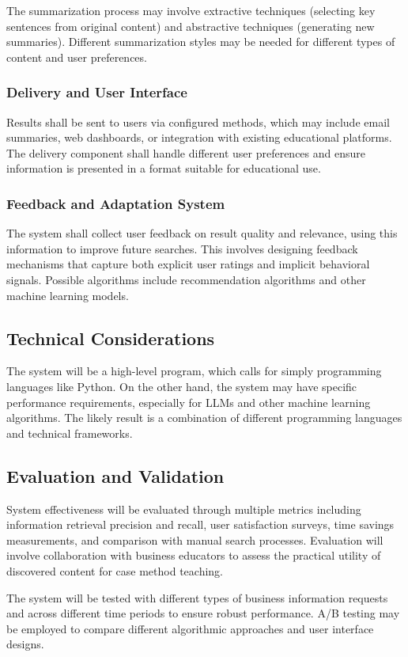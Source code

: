 \documentclass[final-report]{report-template}
\begin{document}
The summarization process may involve extractive techniques (selecting key
sentences from original content) and abstractive techniques (generating new
summaries). Different summarization styles may be needed for different types of
content and user preferences.

\subsubsection{Delivery and User Interface} Results shall be sent to users via
configured methods, which may include email summaries, web dashboards, or
integration with existing educational platforms. The delivery component shall
handle different user preferences and ensure information is presented in a
format suitable for educational use.

\subsubsection{Feedback and Adaptation System} The system shall collect user
feedback on result quality and relevance, using this information to improve
future searches. This involves designing feedback mechanisms that capture both
explicit user ratings and implicit behavioral signals. Possible algorithms
include recommendation algorithms and other machine learning models.

\subsection{Technical Considerations} 
The system will be a high-level program, which calls for simply programming
languages like Python. On the other hand, the system may have specific
performance requirements, especially for LLMs and other machine learning
algorithms. The likely result is a combination of different programming
languages and technical frameworks.

\subsection{Evaluation and Validation} System effectiveness will be evaluated
through multiple metrics including information retrieval precision and recall,
user satisfaction surveys, time savings measurements, and comparison with
manual search processes. Evaluation will involve collaboration with business
educators to assess the practical utility of discovered content for case method
teaching.

The system will be tested with different types of business information requests
and across different time periods to ensure robust performance. A/B testing may
be employed to compare different algorithmic approaches and user interface
designs.
\end{document}
